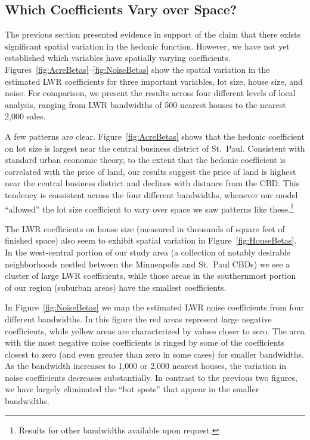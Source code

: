 \documentclass{article}\usepackage{graphicx, color}
\begin{document}
\subsection{Which Coefficients Vary over Space?}

The previous section presented evidence in support of the claim that there exists significant spatial variation in the hedonic function. However, we have not yet established which variables have spatially varying coefficients. Figures~\ref{fig:AcreBetas}--\ref{fig:NoiseBetas} show the spatial variation in the estimated LWR coefficients for three important variables, lot size, house size, and noise. For comparison, we present the results across four different levels of local analysis, ranging from LWR bandwidths of 500 nearest houses to the nearest 2,000 sales. 

A few patterns are clear. Figure~\ref{fig:AcreBetas} shows that the hedonic coefficient on lot size is largest near the central business district of St.\ Paul. Consistent with standard urban economic theory, to the extent that the hedonic coefficient is correlated with the price of land, our results suggest the price of land is highest near the central business district and declines with distance from the CBD. This tendency is consistent across the four different bandwidths, whenever our model ``allowed'' the lot size coefficient to vary over space we saw patterns like these.\footnote{Results for other bandwidths available upon request.} 

The LWR coefficients on house size (measured in thousands of square feet of finished space) also seem to exhibit spatial variation in Figure~\ref{fig:HouseBetas}. In the west-central portion of our study area (a collection of notably desirable neighborhoods nestled between the Minneapolis and St.\ Paul CBDs) we see a cluster of large LWR coefficients, while those areas in the southernmost portion of our region (suburban areas) have the smallest coefficients. 

In Figure~\ref{fig:NoiseBetas} we map the estimated LWR noise coefficients from four different bandwidths. In this figure the red areas represent large negative coefficients, while yellow areas are characterized by values closer to zero. The area with the most negative noise coefficients is ringed by some of the coefficients closest to zero (and even greater than zero in some cases) for smaller bandwidths. As the bandwidth increases to 1,000 or 2,000 nearest houses, the variation in noise coefficients decreases substantially. In contrast to the previous two figures, we have largely eliminated the ``hot spots'' that appear in the smaller bandwidths. 
\end{document}
